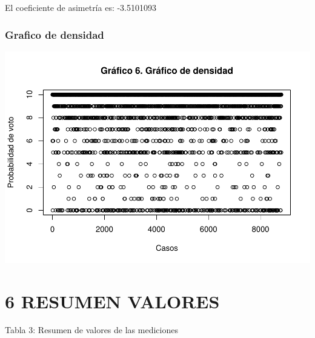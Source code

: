 \documentclass[
  12 pt,
  a4paper,
]{article}
\newenvironment{Shaded}{\begin{snugshade}}{\end{snugshade}}
\newcommand{\AttributeTok}[1]{\textcolor[rgb]{0.13,0.29,0.53}{#1}}
\newcommand{\FunctionTok}[1]{\textcolor[rgb]{0.13,0.29,0.53}{\textbf{#1}}}
\newcommand{\NormalTok}[1]{#1}
\newcommand{\SpecialCharTok}[1]{\textcolor[rgb]{0.81,0.36,0.00}{\textbf{#1}}}
\newcommand{\StringTok}[1]{\textcolor[rgb]{0.31,0.60,0.02}{#1}}
\begin{document}
El coeficiente de asimetría es: -3.5101093

\hypertarget{grafico-de-densidad}{%
\subsubsection{Grafico de densidad}\label{grafico-de-densidad}}

\begin{Shaded}
\end{Shaded}

\includegraphics{probabilidadVoto_files/figure-latex/graficoDensidad-1.pdf}

\newpage

\hypertarget{resumen-valores}{%
\section{6 RESUMEN VALORES}\label{resumen-valores}}

Tabla 3: Resumen de valores de las mediciones
\end{document}
